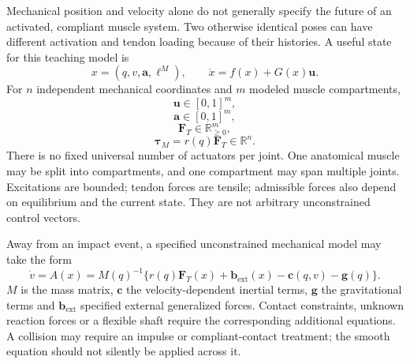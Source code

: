 Mechanical position and velocity alone do not generally specify the future of an activated, compliant muscle system. Two otherwise identical poses can have different activation and tendon loading because of their histories. A useful state for this teaching model is
\begin{equation}
x=(q,v,\boldsymbol a,\boldsymbol\ell^M),\qquad \dot x=f(x)+G(x)\boldsymbol u.
\label{eq:control-affine-remit}
\end{equation}
For $n$ independent mechanical coordinates and $m$ modeled muscle compartments,
\begin{equation}
\boldsymbol u\in[0,1]^m,
\label{eq:neural-command}
\end{equation}
\begin{equation}
\boldsymbol a\in[0,1]^m,
\label{eq:activation-vector}
\end{equation}
\begin{equation}
\boldsymbol F_T\in\mathbb R_{\geq0}^m,
\label{eq:force-vector}
\end{equation}
\begin{equation}
\boldsymbol\tau_M=r(q)\boldsymbol F_T\in\mathbb R^n.
\label{eq:torque-from-muscles}
\end{equation}
There is no fixed universal number of actuators per joint. One anatomical muscle may be split into compartments, and one compartment may span multiple joints. Excitations are bounded; tendon forces are tensile; admissible forces also depend on equilibrium and the current state. They are not arbitrary unconstrained control vectors.

Away from an impact event, a specified unconstrained mechanical model may take the form
\[
\dot v=A(x)=M(q)^{-1}\{r(q)\boldsymbol F_T(x)
+\boldsymbol b_{\mathrm{ext}}(x)-\boldsymbol c(q,v)-\boldsymbol g(q)\}.
\]
$M$ is the mass matrix, $\boldsymbol c$ the velocity-dependent inertial terms, $\boldsymbol g$ the gravitational terms and $\boldsymbol b_{\mathrm{ext}}$ specified external generalized forces. Contact constraints, unknown reaction forces or a flexible shaft require the corresponding additional equations. A collision may require an impulse or compliant-contact treatment; the smooth equation should not silently be applied across it.

